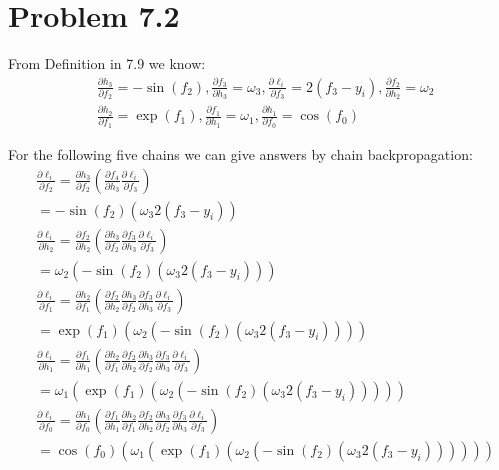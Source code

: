 \documentclass{article}
\begin{document}
\section*{Problem 7.2}
From Definition in 7.9 we know:
\[
\begin{aligned}
&\frac{\partial h_3}{\partial f_2} = -\sin{(f_2)}  ,
\frac{\partial f_3}{\partial h_3} = \omega_3  ,
\frac{\partial \ell_i}{\partial f_3} = 2\left( f_3 - y_i \right)  ,
\frac{\partial f_2}{\partial h_2} = \omega_2 \\
&\frac{\partial h_2}{\partial f_1} = \exp{(f_1)},
\frac{\partial f_1}{\partial h_1} = \omega_1 ,
\frac{\partial h_1}{\partial f_0} = \cos{(f_0)} 
\end{aligned}
\]

For the following five chains we can give answers by chain backpropagation:
\[
\begin{aligned}
&\frac{\partial \ell_i}{\partial f_2} = \frac{\partial h_3}{\partial f_2} \left( \frac{\partial f_4}{\partial h_3} \frac{\partial \ell_i}{\partial f_3} \right)  \\
& = -\sin{(f_2)} \left( \omega_3 2\left( f_3 - y_i \right) \right) \\
&\frac{\partial \ell_i}{\partial h_2} = \frac{\partial f_2}{\partial h_2} \left( \frac{\partial h_3}{\partial f_2}  \frac{\partial f_3}{\partial h_3} \frac{\partial \ell_i}{\partial f_3} \right) \\
& = \omega_2 \left( -\sin{(f_2)} \left( \omega_3 2\left( f_3 - y_i \right) \right)\right) \\
&\frac{\partial \ell_i}{\partial f_1} = \frac{\partial h_2}{\partial f_1} \left( \frac{\partial f_2}{\partial h_2}  \frac{\partial h_3}{\partial f_2}  \frac{\partial f_3}{\partial h_3} \frac{\partial \ell_i}{\partial f_3} \right) \\
&= \exp{(f_1)} \left( \omega_2 \left( -\sin{(f_2)} \left( \omega_3 2\left( f_3 - y_i \right) \right)\right) \right) \\
&\frac{\partial \ell_i}{\partial h_1} = \frac{\partial f_1}{\partial h_1} \left(
\frac{\partial h_2}{\partial f_1} \frac{\partial f_2}{\partial h_2}  \frac{\partial h_3}{\partial f_2}  \frac{\partial f_3}{\partial h_3} \frac{\partial \ell_i}{\partial f_3} \right) \\
&= \omega_1 \left( \exp{(f_1)} \left( \omega_2 \left( -\sin{(f_2)} \left( \omega_3 2\left( f_3 - y_i \right) \right)\right) \right) \right) \\
&\frac{\partial \ell_i}{\partial f_0} = \frac{\partial h_1}{\partial f_0} \left(
\frac{\partial f_1}{\partial h_1} \frac{\partial h_2}{\partial f_1} \frac{\partial f_2}{\partial h_2}  \frac{\partial h_3}{\partial f_2}  \frac{\partial f_3}{\partial h_3} \frac{\partial \ell_i}{\partial f_3} \right) \\
&= \cos{(f_0)} \left( \omega_1 \left( \exp{(f_1)} \left( \omega_2 \left( -\sin{(f_2)} \left( \omega_3 2\left( f_3 - y_i \right) \right)\right) \right) \right) \right)
\end{aligned}
\]
\end{document}
